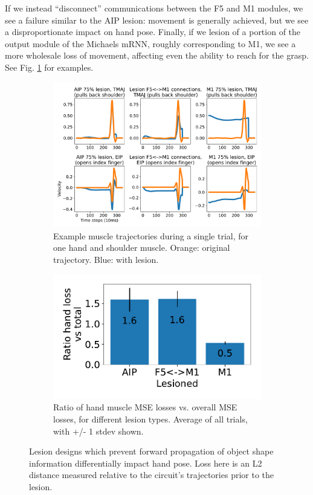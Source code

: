 \documentclass[12pt]{iopart}
\begin{document}
If we instead ``disconnect'' communications between the F5 and M1 modules, we see a
failure similar to the AIP lesion: movement is generally achieved, but we see a
disproportionate impact on hand pose. Finally, if we lesion of a portion of the output
module of the Michaels mRNN, roughly corresponding to M1, we see a more wholesale loss
of movement, affecting even the ability to reach for the grasp.
See Fig. \ref{fig:lesion} for examples.

\begin{figure}[h]
	\centering
	\begin{subfigure}[c]{0.62\textwidth}
	    \centering
	    \includegraphics[width=\textwidth]{lesion_trajs.pdf}
	    \caption{Example muscle trajectories during a single trial, for one hand and shoulder muscle.
	             Orange: original trajectory. Blue: with lesion.}
	\end{subfigure}
	\hfill
	\begin{subfigure}[c]{0.32\textwidth}
	    \centering
	    \includegraphics[width=\textwidth]{lesion_hand.pdf}
	    \caption{Ratio of hand muscle MSE losses vs. overall MSE losses, for different lesion types.
	             Average of all trials, with +/- 1 stdev shown.}
	\end{subfigure}
	\hfill
	\caption{Lesion designs which prevent forward propagation of object shape information
	         differentially impact hand pose. Loss here is an L2 distance
		 measured relative to the circuit's trajectories prior to the lesion.}
	\label{fig:lesion}
\end{figure}
\end{document}
